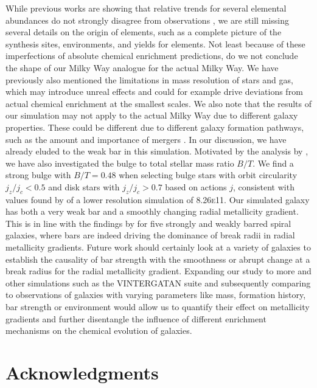 \documentclass[fleqn,usenatbib]{mnras}
\begin{document}
While previous works are showing that relative trends for several elemental abundances do not strongly disagree from observations \citep{Buck2021, Buder2024}, we are still missing several details on the origin of elements, such as a complete picture of the synthesis sites, environments, and yields for elements. Not least because of these imperfections of absolute chemical enrichment predictions, do we not conclude the shape of our Milky Way analogue for the actual Milky Way. We have previously also mentioned the limitations in mass resolution of stars and gas, which may introduce unreal effects and could for example drive deviations from actual chemical enrichment at the smallest scales. We also note that the results of our simulation may not apply to the actual Milky Way due to different galaxy properties. These could be different due to different galaxy formation pathways, such as the amount and importance of mergers \citep{Buck2023, Buder2024}. In our discussion, we have already eluded to the weak bar in this simulation. Motivated by the analysis by \citet{Tuntipong2024}, we have also investigated the bulge to total stellar mass ratio $B/T$. We find a strong bulge with $B/T = 0.48$ when selecting bulge stars with orbit circularity $j_z/j_c < 0.5$ and disk stars with $j_z/j_c > 0.7$ based on actions $j$, consistent with values found by \citet{Obreja2019} of a lower resolution simulation of \textsc{8.26e11}. Our simulated galaxy has both a very weak bar and a smoothly changing radial metallicity gradient. This is in line with the findings by \citet{Chen2023} for five strongly and weakly barred spiral galaxies, where bars are indeed driving the dominance of break radii in radial metallicity gradients. Future work should certainly look at a variety of galaxies to establish the causality of bar strength with the smoothness or abrupt change at a break radius for the radial metallicity gradient. Expanding our study to more and other simulations such as the \textsc{VINTERGATAN} suite \citep{Renaud2024} and subsequently comparing to observations of galaxies with varying parameters like mass, formation history, bar strength or environment would allow us to quantify their effect on metallicity gradients and further disentangle the influence of different enrichment mechanisms on the chemical evolution of galaxies.

\section*{Acknowledgments}
\end{document}
